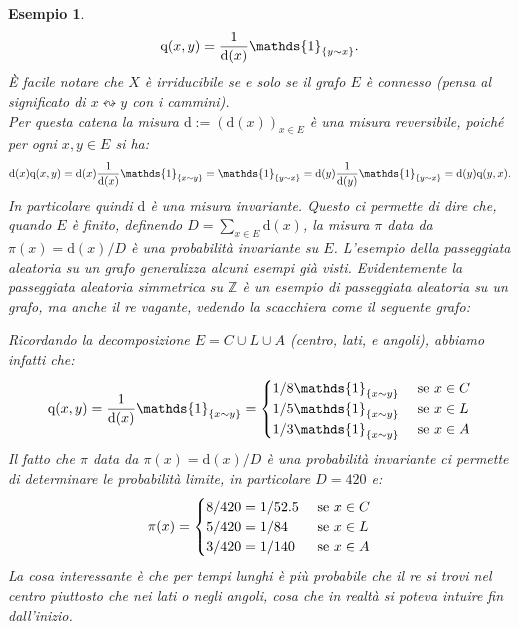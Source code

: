\documentclass[11pt]{book}
\theoremstyle{Definizione}
\theoremstyle{TeoremaProposizioneLemmaCorollario}
\theoremstyle{OsservazioneNota}
\newtheorem{myes}{Esempio}[section]
\newcommand{\Z}{\mathbb{Z}}
\renewcommand{\d}{\mathrm{d}}
\renewcommand{\i}{\textup{i}}
\newcommand{\comunica}{\leftrightsquigarrow}
\newcommand{\q}{\textup{q}}
\newcommand{\uno}[1]{\mathds{1}_{#1}}
\begin{document}
\begin{myes}
$$
\q(x,y) = \frac{1}{\d(x)}\uno{\{y\sim x\}}.
$$
È facile notare che $X$ è irriducibile se e solo se il grafo $E$ è connesso (pensa al significato di $x \comunica y$ con i cammini).\\
Per questa catena la misura $\d := (\d(x))_{x\in E}$ è una misura reversibile, poiché per ogni $x,y\in E$ si ha:
$$
\d(x)\q(x,y) = \d(x)\frac{1}{\d(x)} \uno{\{x\sim y\}} = \uno{\{y\sim x\}} = \d(y)\frac{1}{\d(y)}\uno{\{y\sim x\}} = \d(y)\q(y,x).
$$
In particolare quindi $\d$ è una misura invariante. Questo ci permette di dire che, quando $E$ è finito, definendo $D = \sum_{x\in E} \d(x)$, la misura $\pi$ data da $\pi(x) = \d(x)/D$ è una probabilità invariante su $E$.
L'esempio della passeggiata aleatoria su un grafo generalizza alcuni esempi già visti. Evidentemente la passeggiata aleatoria simmetrica su $\Z$ è un esempio di passeggiata aleatoria su un grafo, ma anche il re vagante, vedendo la scacchiera come il seguente grafo:
\begin{center}
\end{center}
Ricordando la decomposizione $E = C \cup L \cup A$ (centro, lati, e angoli), abbiamo infatti che:
$$
\q(x,y) = \frac{1}{\d(x)}\uno{\{x\sim y\}} = \begin{cases}
1/8\uno{\{x\sim y\}} &\textup{ se }x\in C\\
1/5\uno{\{x\sim y\}} &\textup{ se }x\in L\\
1/3\uno{\{x\sim y\}} &\textup{ se }x\in A
\end{cases}
$$
Il fatto che $\pi$ data da $\pi(x) = \d(x)/D$ è una probabilità invariante ci permette di determinare le probabilità limite, in particolare $D = 420$ e:
$$
\pi(x) = \begin{cases}
8/420 = 1/52.5 &\textup{ se }x\in C\\
5/420 = 1/84   &\textup{ se }x\in L\\
3/420 = 1/140  &\textup{ se }x\in A
\end{cases}
$$
La cosa interessante è che per tempi lunghi è più probabile che il re si trovi nel centro piuttosto che nei lati o negli angoli, cosa che in realtà si poteva intuire fin dall'inizio.
\end{myes}
\end{document}
